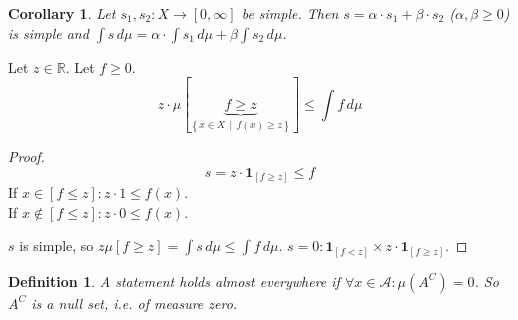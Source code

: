 \documentclass[a4paper]{article}
\newcounter{lecref}[section]
\numberwithin{lecref}{section}
\theoremstyle{break}
\newtheorem{definition}[lecref]{Definition}
\newtheorem{corollary}[lecref]{Corollary}
\newcommand{\SetDef}[2]{\left\{#1\,\mid\,#2\right\}}
\begin{document}
\begin{corollary}
  Let $s_1, s_2: X \to [0, \infty]$ be simple.
  Then $s = \alpha \cdot s_1 + \beta \cdot s_2$ ($\alpha, \beta \geq 0$) is simple and $\int s \, d\mu = \alpha \cdot \int s_1 \, d\mu + \beta \int s_2 \, d\mu$.
\end{corollary}

\begin{theorem}
  Let $z \in \mathbb R$. Let $f \geq 0$.
  \[ z \cdot \mu [\underbrace{f \geq z}_{\SetDef{x \in X}{f(x) \geq z}}] \leq \int f \, d\mu \]
\end{theorem}
\begin{proof}
  \[ s = z \cdot \mathbf{1}_{[f \geq z]} \leq f \]
  If $x \in [f \leq z]: z \cdot 1 \leq f(x)$. \\
  If $x \not\in [f \leq z]: z \cdot 0 \leq f(x)$.

  $s$ is simple, so $z\mu [f \geq z] = \int s \, d\mu \leq \int f \, d\mu$.
  $s = 0: \mathbf{1}_{[f < z]} \times z \cdot \mathbf{1}_{[f \geq z]}$.
\end{proof}

\begin{definition}
  A statement holds \emph{almost everywhere} if $\forall x \in \mathcal A: \mu(A^C) = 0$. So $A^C$ is a null set, i.e. of measure zero.
\end{definition}
\end{document}
